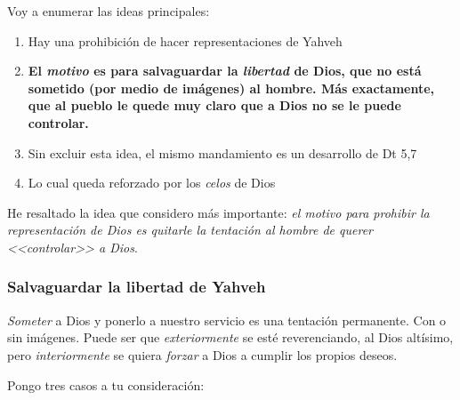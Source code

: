 \noindent
Voy a enumerar las ideas principales:

\begin{enumerate}
\item Hay una prohibici\'on de hacer representaciones de Yahveh
\item \textbf{El \emph{motivo} es para salvaguardar la \emph{libertad} de Dios, que no est\'a sometido (por medio de im\'agenes) al hombre. M\'as exactamente, que al pueblo le quede muy claro que a Dios no se le puede controlar.}
\item Sin excluir esta idea, el mismo mandamiento es un desarrollo de Dt 5,7
\item Lo cual queda reforzado por los \emph{celos} de Dios
\end{enumerate}

\noindent
He resaltado la idea que considero m\'as importante: \emph{el motivo para prohibir la representaci\'on de Dios es quitarle la tentaci\'on al hombre de querer <<controlar>> a Dios}.



\subsubsection{Salvaguardar la libertad de Yahveh}

\emph{Someter} a Dios y ponerlo a nuestro servicio es una tentaci\'on permanente. Con o sin im\'agenes. Puede ser que \emph{exteriormente} se est\'e reverenciando, al Dios alt\'{i}simo, pero \emph{interiormente} se quiera \emph{forzar} a Dios a cumplir los propios deseos.

Pongo tres casos a tu consideraci\'on:

